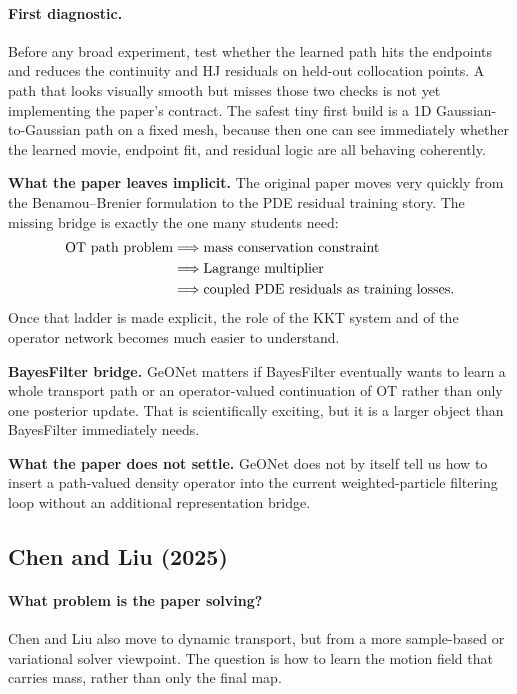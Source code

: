 \documentclass[11pt]{report}
\begin{document}
\paragraph{First diagnostic.}
Before any broad experiment, test whether the learned path hits the endpoints and
reduces the continuity and HJ residuals on held-out collocation points.  A path that
looks visually smooth but misses those two checks is not yet implementing the paper's
contract.  The safest tiny first build is a 1D Gaussian-to-Gaussian path on a fixed
mesh, because then one can see immediately whether the learned movie, endpoint fit,
and residual logic are all behaving coherently.

\textbf{What the paper leaves implicit.}
The original paper moves very quickly from the Benamou--Brenier formulation to the
PDE residual training story.  The missing bridge is exactly the one many students
need:
\begin{align}
\text{OT path problem}
&\Longrightarrow
\text{mass conservation constraint}
\notag\\
&\Longrightarrow
\text{Lagrange multiplier}
\notag\\
&\Longrightarrow
\text{coupled PDE residuals as training losses}.
\label{eq:geonet-teaching-bridge}
\end{align}
Once that ladder is made explicit, the role of the KKT system and of the operator
network becomes much easier to understand.

\textbf{BayesFilter bridge.}
GeONet matters if BayesFilter eventually wants to learn a whole transport path or an
operator-valued continuation of OT rather than only one posterior update.  That is
scientifically exciting, but it is a larger object than BayesFilter immediately
needs.

\textbf{What the paper does not settle.}
GeONet does not by itself tell us how to insert a path-valued density operator into
the current weighted-particle filtering loop without an additional representation
bridge.

\subsection*{Chen and Liu (2025)}

\paragraph{What problem is the paper solving?}
Chen and Liu also move to dynamic transport, but from a more sample-based or
variational solver viewpoint.  The question is how to learn the motion field that
carries mass, rather than only the final map.
\end{document}
